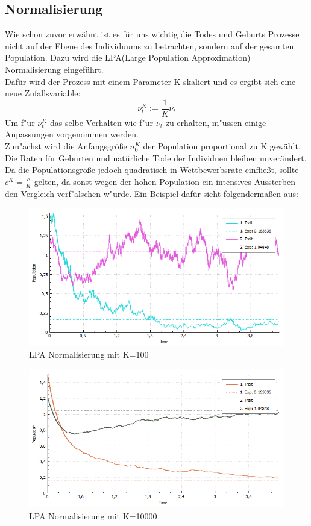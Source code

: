 \documentclass[11pt, a4paper, german]{article}
\begin{document}
	\subsection{Normalisierung}
	Wie schon zuvor erwähnt ist es für uns wichtig die Todes und Geburts Prozesse nicht auf der Ebene des Individuums zu betrachten, sondern auf der gesamten Population. Dazu wird die LPA(Large Population Approximation) Normalisierung eingeführt.\\
	Dafür wird der Prozess mit einem Parameter K skaliert und es ergibt sich eine neue Zufallsvariable:
	\[ \nu_t^K := \frac{1}{K} \nu_t \]
	Um f"ur $ \nu_t^K $ das selbe Verhalten wie f"ur $ \nu_t $ zu erhalten, m"ussen einige Anpassungen vorgenommen werden.\\
	Zun"achst wird die Anfangsgröße $ n_0^K $ der Population proportional zu K gewählt.
	Die Raten für Geburten und natürliche Tode der Individuen bleiben unverändert. Da die Populationsgröße jedoch quadratisch in Wettbewerbsrate einfließt, sollte $ c^K = \frac{c}{K} $ gelten, da sonst wegen der hohen Population ein intensives Aussterben den Vergleich verf"alschen w"urde. Ein Beispiel dafür sieht folgendermaßen aus:
	\begin{figure}[H]
		\centering
		\includegraphics[width=0.7\linewidth]{./Pictures/LPANormalisierungK100}
		\caption[LPAK100]{LPA Normalisierung mit K=100}
		\label{LPA Normalisierung K=100}
	\end{figure}
	\begin{figure}[H]
		\centering
		\includegraphics[width=0.7\linewidth]{./Pictures/LPANormalisierungK10000}
		\caption[LPAK100]{LPA Normalisierung mit K=10000}
		\label{LPA Normalisierung K=10000}
	\end{figure}	
	
\end{document}
